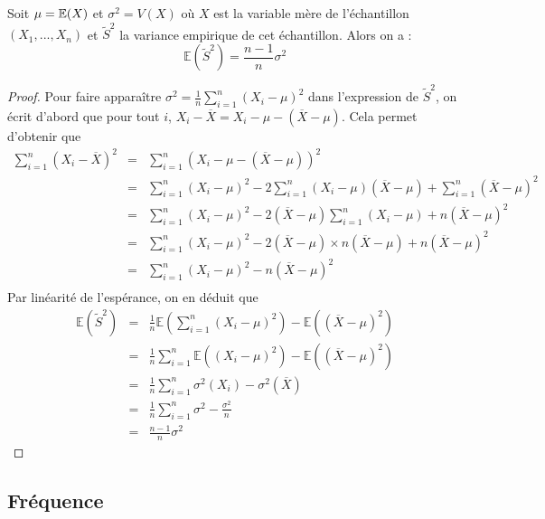 \begin{proposition}{}{}
 Soit $\mu=\mathbb{E}(X)$ et $\sigma^2=V(X)$ où $X$ est la variable mère de l'échantillon $(X_1,...,X_n)$ et  $\tilde{S}^2$ la variance empirique de cet échantillon. Alors on a :
  $$\mathbb{E}(\tilde{S}^2)=\frac{n-1}{n} \sigma^2$$
\end{proposition}
\begin{proof}
 Pour faire apparaître $\sigma^2 = \frac{1}{n}\sum_{i=1}^n (X_i-\mu)^2$ dans l'expression de $\tilde{S}^2$, on écrit d'abord que pour tout $i$, $X_i-\overline{X} = X_i-\mu -(\overline{X}-\mu)$. Cela permet d'obtenir que 
 \begin{eqnarray*}
  \sum_{i=1}^n (X_i-\overline{X})^2 & = & \sum_{i=1}^n (X_i-\mu -(\overline{X}-\mu))^2 \\
                           & = & \sum_{i=1}^n (X_i-\mu)^2-2 \sum_{i=1}^n (X_i-\mu) (\overline{X}-\mu) + \sum_{i=1}^n(\overline{X}-\mu)^2\\
                           & = & \sum_{i=1}^n (X_i-\mu)^2-2 (\overline{X}-\mu)\sum_{i=1}^n (X_i-\mu)  + n(\overline{X}-\mu)^2\\
                           & = & \sum_{i=1}^n (X_i-\mu)^2-2 (\overline{X}-\mu) \times n (\overline{X}-\mu)  + n(\overline{X}-\mu)^2\\
                           & = & \sum_{i=1}^n (X_i-\mu)^2- n(\overline{X}-\mu)^2\\
 \end{eqnarray*}
Par linéarité de l'espérance, on en déduit que 
\begin{eqnarray*}
 \mathbb{E}(\tilde{S}^2) & = & \frac{1}{n} \mathbb{E}\left(\sum_{i=1}^n (X_i-\mu)^2\right)-\mathbb{E}\left((\overline{X}-\mu)^2 \right) \\
                 & = & \frac{1}{n} \sum_{i=1}^n \mathbb{E}\left( (X_i-\mu)^2\right)-\mathbb{E}\left((\overline{X}-\mu)^2 \right) \\
                 & = & \frac{1}{n} \sum_{i=1}^n \sigma^2(X_i)- \sigma^2(\overline{X}) \\
                 & = & \frac{1}{n} \sum_{i=1}^n \sigma^2-  \frac{\sigma^2}{n} \\
                 & = & \frac{n-1}{n} \sigma^2 
\end{eqnarray*}
\end{proof}

\subsection{Fréquence}

